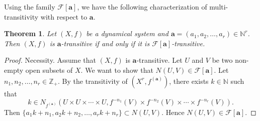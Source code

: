 \documentclass[12pt,a4paper]{amsart}
\newtheorem{thm}{Theorem}[section]
\theoremstyle{definition}
\numberwithin{equation}{section}
\begin{document}
Using the family $\mathcal{F}[\mathbf{a}]$, we have the following characterization of multi-transitivity
with respect to $\mathbf{a}$.
\begin{thm}\label{thm:trans-vetor-equ-condi}
Let $(X,f)$ be a dynamical system and $\mathbf{a}=(a_1,a_2,\dotsc,a_r)\in \mathbb{N}^r$.
Then $(X,f)$ is $\mathbf{a}$-transitive if and only if  it is $\mathcal{F}[\mathbf{a}]$-transitive.
\end{thm}
 \begin{proof}
Necessity. Assume that $(X,f)$ is $\mathbf{a}$-transitive.
Let $U$ and $V$ be two non-empty open subsets of $X$.
We want to show that  $N(U,V)\in \mathcal{F}[\mathbf{a}]$.
Let $n_1, n_2,\dotsc, n_{r}\in\mathbb{Z}_+$.
By the transitivity of $(X^r,f^{(\mathbf{a})})$, there exists $k\in\mathbb{N}$ such that
\[k\in N_{f^{(\mathbf{a})}} (U\times U\times\dotsb\times U,
f^{-n_1}(V)\times f^{-n_2}(V)\times \dotsb \times f^{-n_r}(V)).\]
Then $\{a_{1}k+n_1,a_{2}k+n_2, \dotsc, a_rk+n_{r}\}\subset N(U,V)$.
Hence $N(U,V)\in \mathcal{F}[\mathbf{a}]$.


\end{proof}
\end{document}

